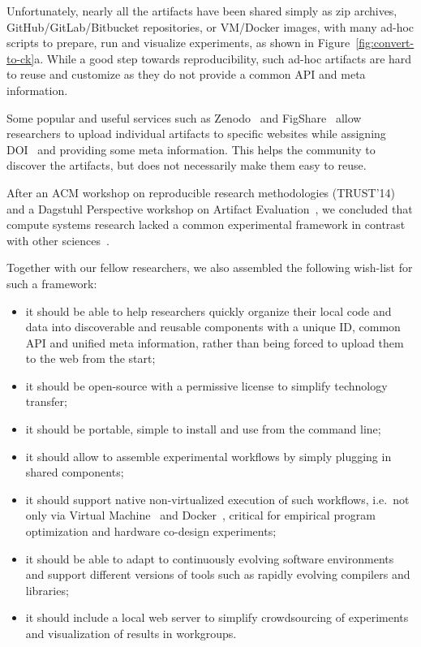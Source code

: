 Unfortunately, nearly all the artifacts have been shared simply as zip
archives, GitHub/GitLab/Bitbucket repositories, or VM/Docker images, with many
ad-hoc scripts to prepare, run and visualize experiments, as shown in
Figure~\ref{fig:convert-to-ck}a.
%
While a good step towards reproducibility, such ad-hoc artifacts are hard to
reuse and customize as they do not provide a common API and meta information.

Some popular and useful services such as Zenodo~\cite{zenodo} and
FigShare~\cite{figshare} allow researchers to upload individual artifacts to
specific websites while assigning DOI~\cite{doi} and providing some meta
information.
%
This helps the community to discover the artifacts, but does not necessarily
make them easy to reuse.

After an ACM workshop on reproducible research methodologies (TRUST'14)~\cite{trust2014}
and a Dagstuhl Perspective workshop on Artifact Evaluation~\cite{childers2016artifact},
we concluded that compute systems research lacked a common experimental
framework in contrast with other sciences~\cite{doi:10.1093/bioinformatics/bth361}.

Together with our fellow researchers, we also assembled the following wish-list
for such a framework:

\begin{itemize}

\item it should be able to help researchers quickly organize their local code
and data into discoverable and reusable components with a unique ID, common API
and unified meta information, rather than being forced to upload them to the
web from the start;

\item it should be open-source with a permissive license to simplify technology
transfer;

\item it should be portable, simple to install and use from the command line;

\item it should allow to assemble experimental workflows by simply plugging in
shared components;

\item it should support native non-virtualized execution of such workflows,
i.e.\ not only via Virtual Machine~\cite{Smith:2005:AVM:1069588.1069632} and
Docker~\cite{docker}, critical for empirical program optimization and hardware
co-design experiments;

\item it should be able to adapt to continuously evolving software environments
and support different versions of tools such as rapidly evolving
compilers and libraries;

\item it should include a local web server to simplify crowdsourcing of
experiments and visualization of results in workgroups.

\end{itemize}

